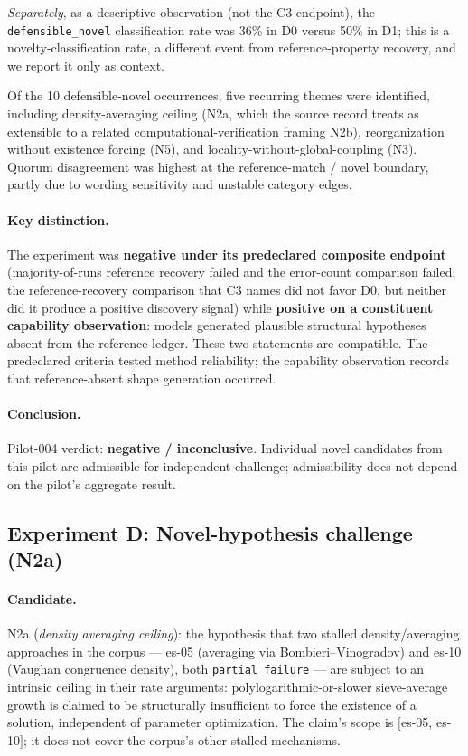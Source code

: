 \documentclass[11pt]{article}
\theoremstyle{gowthm}
\theoremstyle{gowplain}
\begin{document}
\emph{Separately}, as a descriptive observation (not the C3 endpoint), the
\texttt{defensible\_novel} classification rate was 36\% in D0 versus 50\% in D1;
this is a novelty-classification rate, a different event from reference-property
recovery, and we report it only as context.

Of the 10 defensible-novel occurrences, five recurring themes were identified,
including density-averaging ceiling (N2a, which the source record treats as
extensible to a related computational-verification framing N2b),
reorganization without existence
forcing (N5), and locality-without-global-coupling (N3). Quorum disagreement
was highest at the reference-match / novel boundary, partly due to wording
sensitivity and unstable category edges.

\paragraph{Key distinction.}
The experiment was \textbf{negative under its predeclared composite endpoint}
(majority-of-runs reference recovery failed and the error-count comparison
failed; the reference-recovery comparison that C3 names did not favor D0, but
neither did it produce a positive discovery signal) while
\textbf{positive on a constituent capability observation}: models generated
plausible structural hypotheses absent from the reference ledger. These two
statements are compatible. The predeclared criteria tested method reliability;
the capability observation records that reference-absent shape generation occurred.

\paragraph{Conclusion.}
Pilot-004 verdict: \textbf{negative / inconclusive}. Individual novel candidates
from this pilot are admissible for independent challenge; admissibility does not
depend on the pilot's aggregate result.

\subsection{Experiment D: Novel-hypothesis challenge (N2a)}
\label{sec:results-challenge}

\paragraph{Candidate.}
N2a (\emph{density averaging ceiling}): the hypothesis that two stalled
density/averaging approaches in the corpus --- es-05 (averaging via
Bombieri--Vinogradov) and es-10 (Vaughan congruence density), both
\texttt{partial\_failure} --- are subject to an intrinsic ceiling in their
rate arguments: polylogarithmic-or-slower sieve-average growth is claimed to
be structurally insufficient to force the existence of a solution,
independent of parameter optimization. The claim's scope is
$[$es-05, es-10$]$; it does not cover the corpus's other stalled mechanisms.
\end{document}
